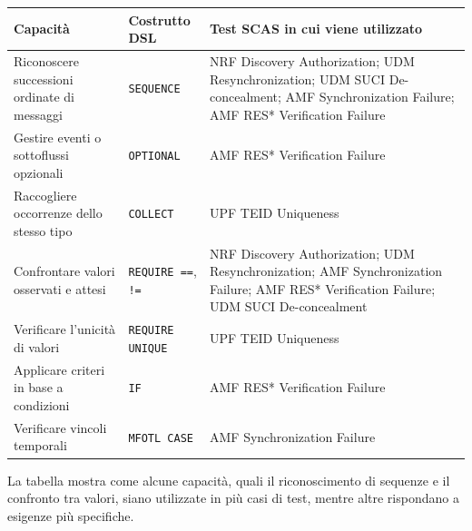 \begin{center}
\begin{minipage}{\textwidth}
\centering
\begingroup
\small
\setlength{\tabcolsep}{5pt}
\renewcommand{\arraystretch}{1.25}

\begin{tabularx}{\textwidth}{|
    >{\raggedright\arraybackslash}p{}|
    >{\raggedright\arraybackslash}p{}|
    >{\raggedright\arraybackslash}X|}
\hline
\rowcolor{blue!7}
\textbf{Capacità} &
\textbf{Costrutto DSL} &
\textbf{Test SCAS in cui viene utilizzato} \\
\hline

Riconoscere successioni ordinate di messaggi &
\texttt{SEQUENCE} &
NRF Discovery Authorization;
UDM Resynchronization;
UDM SUCI De-concealment;
AMF Synchronization Failure;
AMF RES* Verification Failure \\
\hline

Gestire eventi o sottoflussi opzionali &
\texttt{OPTIONAL} &
AMF RES* Verification Failure \\
\hline

Raccogliere occorrenze dello stesso tipo &
\texttt{COLLECT} &
UPF TEID Uniqueness \\
\hline

Confrontare valori osservati e attesi &
\texttt{REQUIRE ==}, \texttt{!=} &
NRF Discovery Authorization;
UDM Resynchronization;
AMF Synchronization Failure;
AMF RES* Verification Failure;
UDM SUCI De-concealment \\
\hline

Verificare l'unicità di valori &
\texttt{REQUIRE UNIQUE} &
UPF TEID Uniqueness \\
\hline

Applicare criteri in base a condizioni &
\texttt{IF} &
AMF RES* Verification Failure \\
\hline

Verificare vincoli temporali &
\texttt{MFOTL CASE} &
AMF Synchronization Failure \\
\hline
\end{tabularx}
\endgroup
{}
\label{tab:capacita-dsl}
\end{minipage}
\end{center}


La tabella mostra come alcune capacità, quali il riconoscimento di sequenze e il confronto tra valori, siano utilizzate in più casi di test, mentre altre rispondano a esigenze più specifiche.

